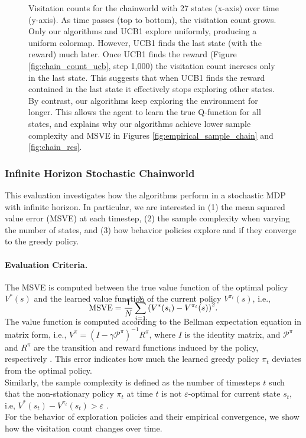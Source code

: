 \documentclass{article}
\newcommand{\reward}{R}
\providecommand{\prob}{\mathcal{P}}
\begin{document}
\begin{figure}[t]
	\caption{\label{fig:chain_count} Visitation counts for the chainworld with 27 states (x-axis) over time (y-axis). 
	As time passes (top to bottom), the visitation count grows. Only our algorithms and UCB1 explore uniformly, producing a uniform colormap. However, UCB1 finds the last state (with the reward) much later. Once UCB1 finds the reward (Figure \ref{fig:chain_count_ucb}, step 1,000) the visitation count increses only in the last state. 
	This suggests that when UCB1 finds the reward contained in the last state it effectively stops exploring other states.
	By contrast, our algorithms keep exploring the environment for longer. This allows the agent to learn the true Q-function for all states, and explains why our algorithms achieve lower sample complexity and MSVE in Figures \ref{fig:empirical_sample_chain} and \ref{fig:chain_res}.}
\end{figure} 

\subsubsection{Infinite Horizon Stochastic Chainworld}
\label{sssec:chain}
This evaluation investigates how the algorithms perform in a stochastic MDP with infinite horizon. In particular, we are interested in (1) the mean squared value error (MSVE) at each timestep, (2) the sample complexity when varying the number of states, and (3) how behavior policies explore and if they converge to the greedy policy.

\paragraph{Evaluation Criteria.}
The MSVE is computed between the true value function of the optimal policy $V^*(s)$ and the learned value function of the current policy $V^{\pi_t}(s)$, i.e.,
\begin{equation}
	\smash{\text{MSVE} = \frac{1}{N}\sum_{i=1}^N{\left(V^*(s_i) - V^{\pi_t}(s)\right)^2}}.
\end{equation}
The value function is computed according to the Bellman expectation equation in matrix form, i.e., $V^\pi = (I - \gamma \prob^\pi)^{-1}\reward^\pi$, where $I$ is the identity matrix, and $\prob^\pi$ and $\reward^\pi$ are the transition and reward functions induced by the policy, respectively \citep{sutton2018reinforcement}. This error indicates how much the learned greedy policy $\pi_t$ deviates from the optimal policy.
\\
Similarly, the sample complexity is defined as the number of timesteps $t$ such that the non-stationary policy $\pi_t$ at time $t$ is not $\varepsilon$-optimal for current state $s_t$, i.e, $V^*(s_t) - V^{\pi_t}(s_t) > \varepsilon$ \citep{strehl2008analysis,dong2019q}.
\\
For the behavior of exploration policies and their empirical convergence, we show how the visitation count changes over time.
\end{document}
